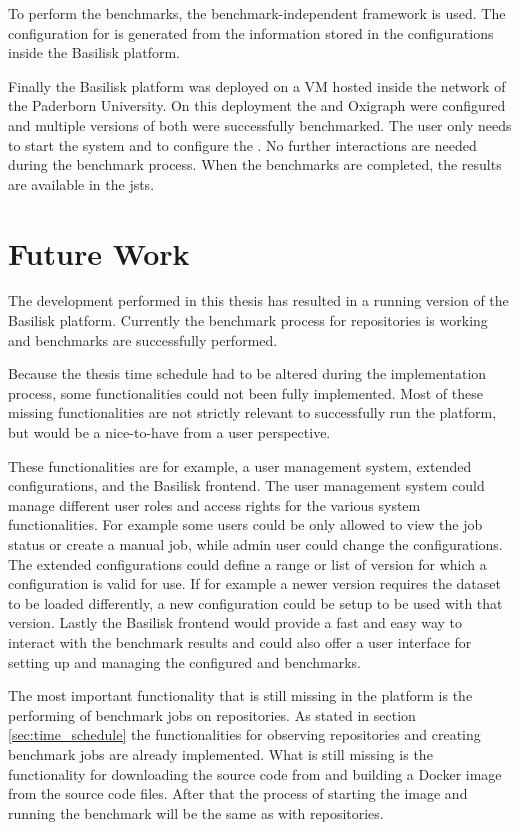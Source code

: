 To perform the benchmarks, the benchmark-independent \iguana{} framework is used.
The configuration for \iguana{} is generated from the information stored in the \ts{} configurations inside the Basilisk platform.

Finally the Basilisk platform was deployed on a VM hosted inside the network of the Paderborn University.
On this deployment the \tentris{} and Oxigraph \tsp{} were configured and multiple versions of both \tsp{} were successfully benchmarked.
The user only needs to start the system and to configure the \tsp{}.
No further interactions are needed during the benchmark process.
When the benchmarks are completed, the results are available in the \acl{jsts}.



\section{Future Work}
\label{sec:future_work}
The development performed in this thesis has resulted in a running version of the Basilisk platform.
Currently the benchmark process for \dockh{} repositories is working and benchmarks are successfully performed.

Because the thesis time schedule had to be altered during the implementation process, some functionalities could not been fully implemented.
Most of these missing functionalities are not strictly relevant to successfully run the platform, but would be a nice-to-have from a user perspective.

These functionalities are for example, a user management system, extended \ts{} configurations, and the Basilisk frontend.
The user management system could manage different user roles and access rights for the various system functionalities.
For example some users could be only allowed to view the job status or create a manual job, while admin user could change the \ts{} configurations.
The extended \ts{} configurations could define a range or list of version for which a configuration is valid for use.
If for example a newer \ts{} version requires the dataset to be loaded differently, a new configuration could be setup to be used with that version.
Lastly the Basilisk frontend would provide a fast and easy way to interact with the benchmark results and could also offer a user interface for setting up and managing the configured \ts{} and benchmarks.

The most important functionality that is still missing in the platform is the performing of benchmark jobs on \gh{} repositories.
As stated in section \ref{sec:time_schedule} the functionalities for observing \gh{} repositories and creating benchmark jobs are already implemented.
What is still missing is the functionality for downloading the source code from \gh{} and building a Docker image from the source code files.
After that the process of starting the image and running the benchmark will be the same as with \dockh{} repositories.





